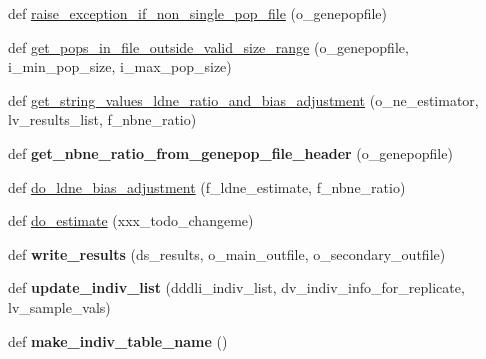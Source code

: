 \begin{DoxyCompactItemize}
\item 
def \hyperlink{namespacenegui_1_1pgdriveneestimator_a4551e387ca20ed229183818ac8ce733c}{raise\+\_\+exception\+\_\+if\+\_\+non\+\_\+single\+\_\+pop\+\_\+file} (o\+\_\+genepopfile)
\item 
def \hyperlink{namespacenegui_1_1pgdriveneestimator_a06645f9b380f736368e27585331ec22f}{get\+\_\+pops\+\_\+in\+\_\+file\+\_\+outside\+\_\+valid\+\_\+size\+\_\+range} (o\+\_\+genepopfile, i\+\_\+min\+\_\+pop\+\_\+size, i\+\_\+max\+\_\+pop\+\_\+size)
\item 
def \hyperlink{namespacenegui_1_1pgdriveneestimator_a7df54bcca5c33c80e648c440527a85ce}{get\+\_\+string\+\_\+values\+\_\+ldne\+\_\+ratio\+\_\+and\+\_\+bias\+\_\+adjustment} (o\+\_\+ne\+\_\+estimator, lv\+\_\+results\+\_\+list, f\+\_\+nbne\+\_\+ratio)
\item 
def {\bfseries get\+\_\+nbne\+\_\+ratio\+\_\+from\+\_\+genepop\+\_\+file\+\_\+header} (o\+\_\+genepopfile)\hypertarget{namespacenegui_1_1pgdriveneestimator_a94131d79681342c10290d15abb65c696}{}\label{namespacenegui_1_1pgdriveneestimator_a94131d79681342c10290d15abb65c696}

\item 
def \hyperlink{namespacenegui_1_1pgdriveneestimator_a99dfc5e3dc217054199cd4f693e26236}{do\+\_\+ldne\+\_\+bias\+\_\+adjustment} (f\+\_\+ldne\+\_\+estimate, f\+\_\+nbne\+\_\+ratio)
\item 
def \hyperlink{namespacenegui_1_1pgdriveneestimator_aeb13bee850fbafd8116a6b7e8048b98c}{do\+\_\+estimate} (xxx\+\_\+todo\+\_\+changeme)
\item 
def {\bfseries write\+\_\+results} (ds\+\_\+results, o\+\_\+main\+\_\+outfile, o\+\_\+secondary\+\_\+outfile)\hypertarget{namespacenegui_1_1pgdriveneestimator_af2d5e050f9a707ed67728913d3ac620f}{}\label{namespacenegui_1_1pgdriveneestimator_af2d5e050f9a707ed67728913d3ac620f}

\item 
def {\bfseries update\+\_\+indiv\+\_\+list} (dddli\+\_\+indiv\+\_\+list, dv\+\_\+indiv\+\_\+info\+\_\+for\+\_\+replicate, lv\+\_\+sample\+\_\+vals)\hypertarget{namespacenegui_1_1pgdriveneestimator_a4185236461b3f8636d0ca816a84f28f8}{}\label{namespacenegui_1_1pgdriveneestimator_a4185236461b3f8636d0ca816a84f28f8}

\item 
def {\bfseries make\+\_\+indiv\+\_\+table\+\_\+name} ()\hypertarget{namespacenegui_1_1pgdriveneestimator_a2a22ddf30dc8ad29107131c4d4ca9be6}{}\label{namespacenegui_1_1pgdriveneestimator_a2a22ddf30dc8ad29107131c4d4ca9be6}


\end{DoxyCompactItemize}
